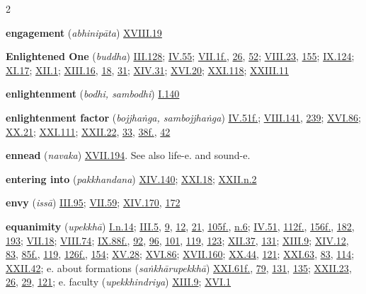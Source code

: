 \begin{multicols}{2}
\begin{vismHanging}
\par\textbf{engagement} (\emph{abhinipāta}) \hyperlink{XVIII.19}{XVIII.19}{}
\par\textbf{Enlightened One} (\emph{buddha}) \hyperlink{III.128}{III.128}{}; \hyperlink{IV.55}{IV.55}{}; \hyperlink{VII.1}{VII.1f.}{}, \hyperlink{VII.26}{26}{}, \hyperlink{VII.52}{52}{}; \hyperlink{VIII.23}{VIII.23}{}, \hyperlink{VIII.155}{155}{}; \hyperlink{IX.124}{IX.124}{}; \hyperlink{XI.17}{XI.17}{}; \hyperlink{XII.1}{XII.1}{}; \hyperlink{XIII.16}{XIII.16}{}, \hyperlink{XIII.18}{18}{}, \hyperlink{XIII.31}{31}{}; \hyperlink{XIV.31}{XIV.31}{}; \hyperlink{XVI.20}{XVI.20}{}; \hyperlink{XXI.118}{XXI.118}{}; \hyperlink{XXIII.11}{XXIII.11}{}
\par\textbf{enlightenment} (\emph{bodhi, sambodhi}) \hyperlink{I.140}{I.140}{}
\par\textbf{enlightenment factor} (\emph{bojjhaṅga, sambojjhaṅga}) \hyperlink{IV.51}{IV.51f.}{}; \hyperlink{VIII.141}{VIII.141}{}, \hyperlink{VIII.239}{239}{}; \hyperlink{XVI.86}{XVI.86}{}; \hyperlink{XX.21}{XX.21}{}; \hyperlink{XXI.111}{XXI.111}{}; \hyperlink{XXII.22}{XXII.22}{}, \hyperlink{XXII.33}{33}{}, \hyperlink{XXII.38}{38f.}{}, \hyperlink{XXII.42}{42}{}
\par\textbf{ennead} (\emph{navaka}) \hyperlink{XVII.194}{XVII.194}{}. See also life-e. and sound-e.
\par\textbf{entering into} (\emph{pakkhandana}) \hyperlink{XIV.140}{XIV.140}{}; \hyperlink{XXI.18}{XXI.18}{}; \hyperlink{XXII.n2}{XXII.n.2}{}
\par\textbf{envy} (\emph{issā}) \hyperlink{III.95}{III.95}{}; \hyperlink{VII.59}{VII.59}{}; \hyperlink{XIV.170}{XIV.170}{}, \hyperlink{XIV.172}{172}{}
\par\textbf{equanimity} (\emph{upekkhā}) \hyperlink{I.n14}{I.n.14}{}; \hyperlink{III.5}{III.5}{}, \hyperlink{III.9}{9}{}, \hyperlink{III.12}{12}{}, \hyperlink{III.21}{21}{}, \hyperlink{III.105}{105f.}{}, \hyperlink{III.n6}{n.6}{}; \hyperlink{IV.51}{IV.51}{}, \hyperlink{IV.112}{112f.}{}, \hyperlink{IV.156}{156f.}{}, \hyperlink{IV.182}{182}{}, \hyperlink{IV.193}{193}{}; \hyperlink{VII.18}{VII.18}{}; \hyperlink{VIII.74}{VIII.74}{}; \hyperlink{IX.88}{IX.88f.}{}, \hyperlink{IX.92}{92}{}, \hyperlink{IX.96}{96}{}, \hyperlink{IX.101}{101}{}, \hyperlink{IX.119}{119}{}, \hyperlink{IX.123}{123}{}; \hyperlink{XII.37}{XII.37}{}, \hyperlink{XII.131}{131}{}; \hyperlink{XIII.9}{XIII.9}{}; \hyperlink{XIV.12}{XIV.12}{}, \hyperlink{XIV.83}{83}{}, \hyperlink{XIV.85}{85f.}{}, \hyperlink{XIV.119}{119}{}, \hyperlink{XIV.126}{126f.}{}, \hyperlink{XIV.154}{154}{}; \hyperlink{XV.28}{XV.28}{}; \hyperlink{XVI.86}{XVI.86}{}; \hyperlink{XVII.160}{XVII.160}{}; \hyperlink{XX.44}{XX.44}{}, \hyperlink{XX.121}{121}{}; \hyperlink{XXI.63}{XXI.63}{}, \hyperlink{XXI.83}{83}{}, \hyperlink{XXI.114}{114}{}; \hyperlink{XXII.42}{XXII.42}{}; e. about formations (\emph{saṅkhārupekkhā}) \hyperlink{XXI.61}{XXI.61f.}{}, \hyperlink{XXI.79}{79}{}, \hyperlink{XXI.131}{131}{}, \hyperlink{XXI.135}{135}{}; \hyperlink{XXII.23}{XXII.23}{}, \hyperlink{XXII.26}{26}{}, \hyperlink{XXII.29}{29}{}, \hyperlink{XXII.121}{121}{}; e. faculty (\emph{upekkhindriya}) \hyperlink{XIII.9}{XIII.9}{}; \hyperlink{XVI.1}{XVI.1}{}

\end{vismHanging}
\end{multicols}
